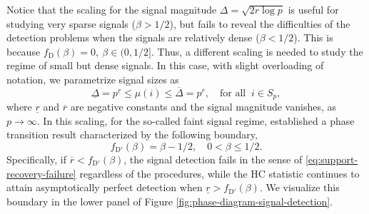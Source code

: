 Notice that the scaling for the signal magnitude $\Delta = \sqrt{2r\log{p}}$ is useful for studying very sparse signals ($\beta>1/2$), but fails to reveal the difficulties of the detection problems when the signals are relatively dense 
($\beta<1/2$).  This is because $f_{\mathrm{D}}(\beta) = 0,\ \beta\in (0,1/2]$. Thus, a different scaling is needed to study the regime of
small but dense signals.  In this case, with slight overloading of notation, we parametrize signal sizes as 
\begin{equation} \label{eq:signal-size-small} 
    \underline{\Delta} = p^{\underline{r}}
    \le \mu(i) \le
    \overline{\Delta} = p^{\overline{r}}, \quad \text{for all}\;\;i\in S_p,
\end{equation}
where $\underline{r}$ and $\overline{r}$ are {\rm negative} constants and 
the signal magnitude vanishes, as $p\to\infty$.
In this scaling, for the so-called faint signal regime, \citet{cai2011optimal} established a phase 
transition result characterized by the following boundary,
\begin{equation} \label{eq:detection-boundary-small-signals}
    f_{\mathrm{D}'}(\beta) = \beta - 1/2, \quad 0 < \beta \le 1/2.
\end{equation} 
Specifically, if $\overline{r}<f_{\mathrm{D}'}(\beta)$, the signal detection fails in the sense of \eqref{eq:support-recovery-failure} regardless of the procedures, while the \ac{HC} statistic continues to attain asymptotically perfect detection when $\underline{r}>f_{\mathrm{D}'}(\beta)$. 
We visualize this boundary in the lower panel of Figure \ref{fig:phase-diagram-signal-detection}.

